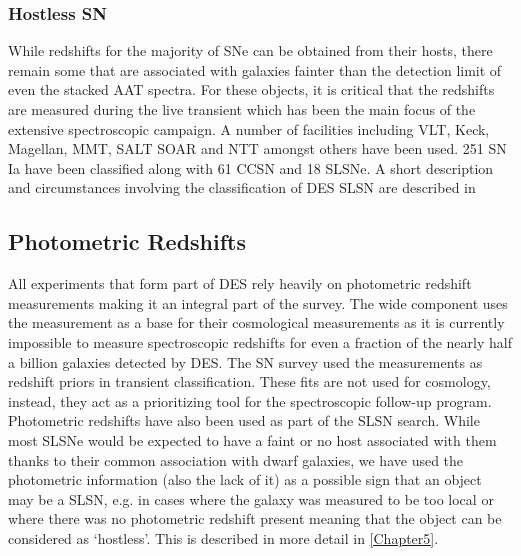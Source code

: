 \subsubsection{Hostless SN}
While redshifts for the majority of SNe can be obtained from their hosts, there remain some that are associated with galaxies fainter than the detection limit of even the stacked AAT spectra. For these objects, it is critical that the redshifts are measured during the live transient which has been the main focus of the extensive spectroscopic campaign. A number of facilities including VLT, Keck, Magellan, MMT, SALT SOAR and NTT amongst others have been used. 251 SN\,Ia have been classified along with 61 CCSN and 18 SLSNe. A short description and circumstances involving the classification of DES SLSN are described in 

\subsection{Photometric Redshifts}
All experiments that form part of DES rely heavily on photometric redshift measurements making it an integral part of the survey. The wide component uses the measurement as a base for their cosmological measurements as it is currently impossible to measure spectroscopic redshifts for even a fraction of the nearly half a billion galaxies detected by DES. The SN survey used the measurements as redshift priors in transient classification. These fits are not used for cosmology, instead, they act as a prioritizing tool for the spectroscopic follow-up program. Photometric redshifts have also been used as part of the SLSN search. While most SLSNe would be expected to have a faint or no host associated with them thanks to their common association with dwarf galaxies, we have used the photometric information (also the lack of it) as a possible sign that an object may be a SLSN, e.g. in cases where the galaxy was measured to be too local or where there was no photometric redshift present meaning that the object can be considered as `hostless'. This is described in more detail in \cref{Chapter5}.

